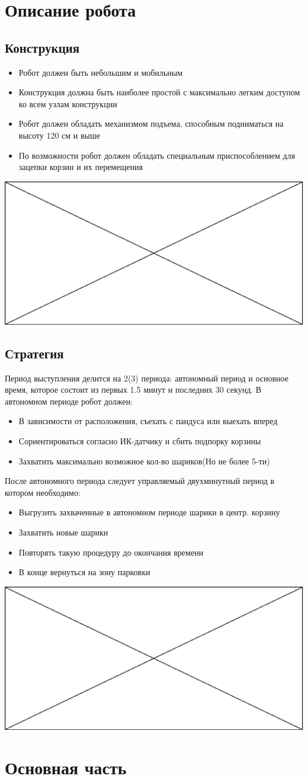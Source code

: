 \documentclass[11pt]{article}
\newcommand\measurepage{\dimexpr\pagegoal-\pagetotal-\baselineskip\relax}
\newcommand\fillpage{\includegraphics[width=\textwidth, height=\measurepage]{img/fill_page.eps}}
\begin{document}
	\section{Описание робота}
		\subsection{Конструкция}
			\begin{itemize}
				\item Робот должен быть небольшим и мобильным
				\item Конструкция должна быть наиболее простой с максимально легким доступом ко всем узлам конструкции
				\item Робот должен обладать механизмом подъема, способным подниматься на высоту 120 см и выше
				\item По возможности робот должен обладать специальным приспособлением для зацепки корзин и их перемещения
			\end{itemize}
			\fillpage
			
		\subsection{Стратегия}
			Период выступления делится на 2(3) периода: автономный период и основное время, которое состоит из первых 1.5 минут и последних 30 секунд.
			В автономном периоде робот должен:
			\begin{itemize}
				\item В зависимости от расположения, съехать с пандуса или выехать вперед
				\item Сориентироваться согласно ИК-датчику и сбить подпорку корзины
				\item Захватить максимально возможное кол-во шариков(Но не более 5-ти)
			\end{itemize}
			После автономного периода следует управляемый двухминутный период в котором необходимо:
			\begin{itemize}
				\item Выгрузить захваченные в автономном периоде шарики в центр. корзину
				\item Захватить новые шарики 
				\item Повторять такую процедуру до окончания времени
				\item В конце вернуться на зону парковки
			\end{itemize}
			\fillpage
		
	\section{Основная часть}
	
\end{document}

